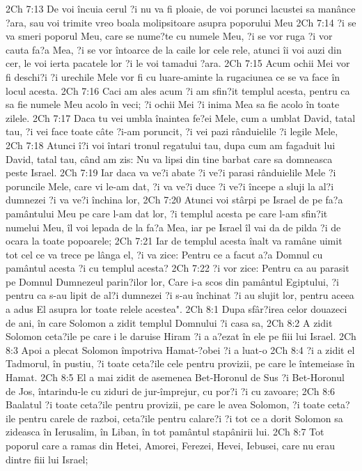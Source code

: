 2Ch 7:13  De voi încuia cerul ?i nu va fi ploaie, de voi porunci lacustei sa manânce ?ara, sau voi trimite vreo boala molipsitoare asupra poporului Meu
2Ch 7:14  ?i se va smeri poporul Meu, care se nume?te cu numele Meu, ?i se vor ruga ?i vor cauta fa?a Mea, ?i se vor întoarce de la caile lor cele rele, atunci îi voi auzi din cer, le voi ierta pacatele lor ?i le voi tamadui ?ara.
2Ch 7:15  Acum ochii Mei vor fi deschi?i ?i urechile Mele vor fi cu luare-aminte la rugaciunea ce se va face în locul acesta.
2Ch 7:16  Caci am ales acum ?i am sfin?it templul acesta, pentru ca sa fie numele Meu acolo în veci; ?i ochii Mei ?i inima Mea sa fie acolo în toate zilele.
2Ch 7:17  Daca tu vei umbla înaintea fe?ei Mele, cum a umblat David, tatal tau, ?i vei face toate câte ?i-am poruncit, ?i vei pazi rânduielile ?i legile Mele,
2Ch 7:18  Atunci î?i voi întari tronul regatului tau, dupa cum am fagaduit lui David, tatal tau, când am zis: Nu va lipsi din tine barbat care sa domneasca peste Israel.
2Ch 7:19  Iar daca va ve?i abate ?i ve?i parasi rânduielile Mele ?i poruncile Mele, care vi le-am dat, ?i va ve?i duce ?i ve?i începe a sluji la al?i dumnezei ?i va ve?i închina lor,
2Ch 7:20  Atunci voi stârpi pe Israel de pe fa?a pamântului Meu pe care l-am dat lor, ?i templul acesta pe care l-am sfin?it numelui Meu, îl voi lepada de la fa?a Mea, iar pe Israel îl vai da de pilda ?i de ocara la toate popoarele;
2Ch 7:21  Iar de templul acesta înalt va ramâne uimit tot cel ce va trece pe lânga el, ?i va zice: Pentru ce a facut a?a Domnul cu pamântul acesta ?i cu templul acesta?
2Ch 7:22  ?i vor zice: Pentru ca au parasit pe Domnul Dumnezeul parin?ilor lor, Care i-a scos din pamântul Egiptului, ?i pentru ca s-au lipit de al?i dumnezei ?i s-au închinat ?i au slujit lor, pentru aceea a adus El asupra lor toate relele acestea".
2Ch 8:1  Dupa sfâr?irea celor douazeci de ani, în care Solomon a zidit templul Domnului ?i casa sa,
2Ch 8:2  A zidit Solomon ceta?ile pe care i le daruise Hiram ?i a a?ezat în ele pe fiii lui Israel.
2Ch 8:3  Apoi a plecat Solomon împotriva Hamat-?obei ?i a luat-o
2Ch 8:4  ?i a zidit el Tadmorul, în pustiu, ?i toate ceta?ile cele pentru provizii, pe care le întemeiase în Hamat.
2Ch 8:5  El a mai zidit de asemenea Bet-Horonul de Sus ?i Bet-Horonul de Jos, întarindu-le cu ziduri de jur-împrejur, cu por?i ?i cu zavoare;
2Ch 8:6  Baalatul ?i toate ceta?ile pentru provizii, pe care le avea Solomon, ?i toate ceta?ile pentru carele de razboi, ceta?ile pentru calare?i ?i tot ce a dorit Solomon sa zideasca în Ierusalim, în Liban, în tot pamântul stapânirii lui.
2Ch 8:7  Tot poporul care a ramas din Hetei, Amorei, Ferezei, Hevei, Iebusei, care nu erau dintre fiii lui Israel;
